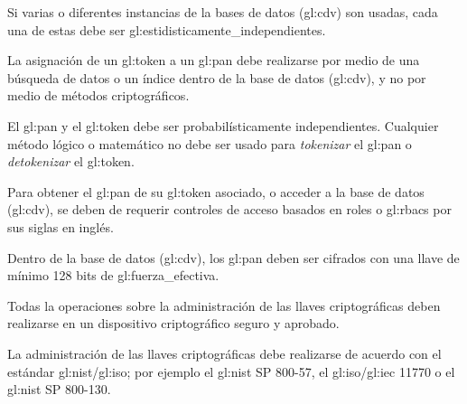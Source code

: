 {
  Si varias o diferentes instancias de la bases de datos (\gls{gl:cdv}) son
  usadas, cada una de estas debe ser \glspl{gl:estidisticamente_independiente}.
}

{
  La asignación de un \gls{gl:token} a un \gls{gl:pan} debe realizarse
  por medio de una búsqueda de datos o un índice dentro de la base de
  datos (\gls{gl:cdv}), y no por medio de métodos criptográficos.

  {
    El \gls{gl:pan} y el \gls{gl:token} debe ser probabilísticamente
    independientes. Cualquier método lógico o matemático no debe ser
    usado para \textit{tokenizar} el \gls{gl:pan} o \textit{detokenizar}
    el \gls{gl:token}.
  }
}

{
  Para obtener el \gls{gl:pan} de su \gls{gl:token} asociado, o acceder
  a la base de datos (\gls{gl:cdv}), se deben de requerir controles de
  acceso basados en roles o \gls{gl:rbacs} por sus siglas en inglés.
}

{
  Dentro de la base de datos (\gls{gl:cdv}), los \gls{gl:pan} deben ser
  cifrados con una llave de mínimo 128 bits de \gls{gl:fuerza_efectiva}.
}

{
  Todas la operaciones sobre la administración de las llaves criptográficas
  deben realizarse en un dispositivo criptográfico seguro y aprobado.
}

{
  La administración de las llaves criptográficas debe realizarse de
  acuerdo con el estándar \gls{gl:nist}/\acrshort{gl:iso}; por ejemplo
  el \gls{gl:nist} SP 800-57, el \acrshort{gl:iso}/\acrshort{gl:iec}
  11770 o el \gls{gl:nist} SP 800-130.
}
